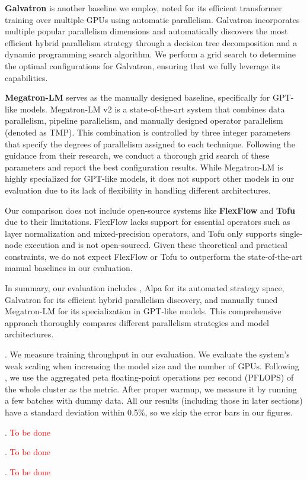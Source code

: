 \par \textbf{Galvatron} is another baseline we employ, noted for its efficient transformer training over multiple GPUs using automatic parallelism. Galvatron incorporates multiple popular parallelism dimensions and automatically discovers the most efficient hybrid parallelism strategy through a decision tree decomposition and a dynamic programming search algorithm. We perform a grid search to determine the optimal configurations for Galvatron, ensuring that we fully leverage its capabilities.

\par \textbf{Megatron-LM} serves as the manually designed baseline, specifically for GPT-like models. Megatron-LM v2 is a state-of-the-art system that combines data parallelism, pipeline parallelism, and manually designed operator parallelism (denoted as TMP). This combination is controlled by three integer parameters that specify the degrees of parallelism assigned to each technique. Following the guidance from their research, we conduct a thorough grid search of these parameters and report the best configuration results. While Megatron-LM is highly specialized for GPT-like models, it does not support other models in our evaluation due to its lack of flexibility in handling different architectures.

Our comparison does not include open-source systems like \textbf{FlexFlow} and \textbf{Tofu} due to their limitations. FlexFlow lacks support for essential operators such as layer normalization and mixed-precision operators, and Tofu only supports single-node execution and is not open-sourced. Given these theoretical and practical constraints, we do not expect FlexFlow or Tofu to outperform the state-of-the-art manual baselines in our evaluation.

In summary, our evaluation includes \sysname, Alpa for its automated strategy space, Galvatron for its efficient hybrid parallelism discovery, and manually tuned Megatron-LM for its specialization in GPT-like models. This comprehensive approach thoroughly compares different parallelism strategies and model architectures.

. We measure training throughput in our evaluation. We evaluate the system's weak scaling when increasing the model size and the number of GPUs. Following \cite{narayanan2021efficient}, we use the aggregated peta floating-point operations per second (PFLOPS) of the whole cluster as the metric. After proper warmup, we measure it by running a few batches with dummy data. All our results (including those in later sections) have a standard deviation within 0.5\%, so we skip the error bars in our figures.

.
\textcolor{red}{To be done}

.
\textcolor{red}{To be done}

.
\textcolor{red}{To be done}